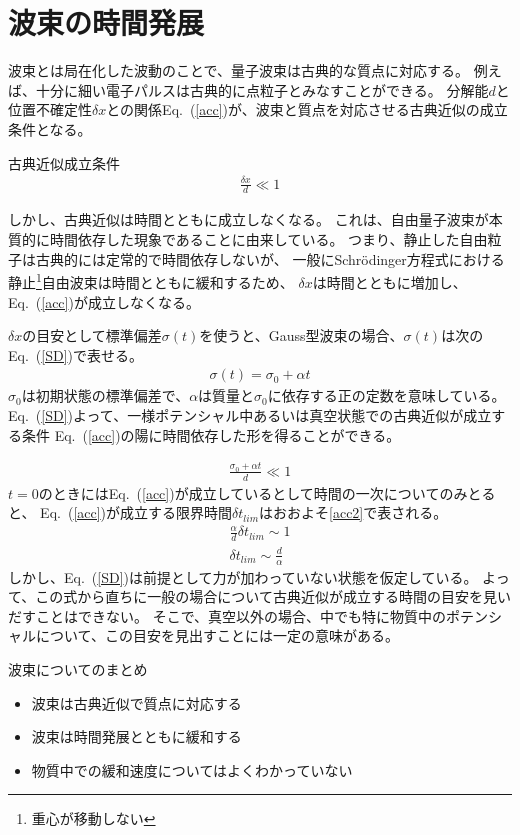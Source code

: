 \documentclass[autodetect-engine,dvipdfmx-if-dvi,ja=standard,a4paper,layout=v2]{bxjsreport}
\newcommand{\eref}[1]{Eq.~(\ref{#1})}
\begin{document}
    \section{波束の時間発展}
    波束とは局在化した波動のことで、量子波束は古典的な質点に対応する。
    例えば、十分に細い電子パルスは古典的に点粒子とみなすことができる。
    分解能$d$と位置不確定性$\delta x$との関係\eref{acc}が、波束と質点を対応させる古典近似の成立条件となる。
    \begin{itembox}[l]{古典近似成立条件}
      \begin{align}
        \frac{\delta x}{d} \ll 1 \label{acc}
      \end{align}
    \end{itembox}
    しかし、古典近似は時間とともに成立しなくなる。
    これは、自由量子波束が本質的に時間依存した現象であることに由来している。
    つまり、静止した自由粒子は古典的には定常的で時間依存しないが、
    一般にSchrödinger方程式における静止\footnote{
      重心が移動しない
    }自由波束は時間とともに緩和するため、
    $\delta x$は時間とともに増加し、\eref{acc}が成立しなくなる。\par
    $\delta x$の目安として標準偏差$\sigma(t)$を使うと、Gauss型波束の場合、$\sigma(t)$は次の\eref{SD}で表せる。
    \begin{align}
      \sigma(t) = \sigma_0 + \alpha t \label{SD}
    \end{align}
    $\sigma_0$は初期状態の標準偏差で、$\alpha$は質量と$\sigma_0$に依存する正の定数を意味している。
    \eref{SD}よって、一様ポテンシャル中あるいは真空状態での古典近似が成立する条件
    \eref{acc}の陽に時間依存した形を得ることができる。\par
    \begin{align}
      \frac{\sigma_0 + \alpha t}{d} \ll 1
    \end{align}
    $t=0$のときには\eref{acc}が成立しているとして時間の一次についてのみとると、
    \eref{acc}が成立する限界時間$\delta t_{lim}$はおおよそ\ref{acc2}で表される。
    \begin{align}
      \frac{\alpha}{d} \delta t_{lim} \sim 1 \nonumber\\
      \delta t_{lim} \sim \frac{d}{\alpha} \label{acc2}
    \end{align}
    しかし、\eref{SD}は前提として力が加わっていない状態を仮定している。
    よって、この式から直ちに一般の場合について古典近似が成立する時間の目安を見いだすことはできない。
    そこで、真空以外の場合、中でも特に物質中のポテンシャルについて、この目安を見出すことには一定の意味がある。
    \begin{itembox}[l]{波束についてのまとめ}
      \begin{itemize}
        \item 波束は古典近似で質点に対応する
        \item 波束は時間発展とともに緩和する
        \item 物質中での緩和速度についてはよくわかっていない
      \end{itemize}
    \end{itembox}
\end{document}
